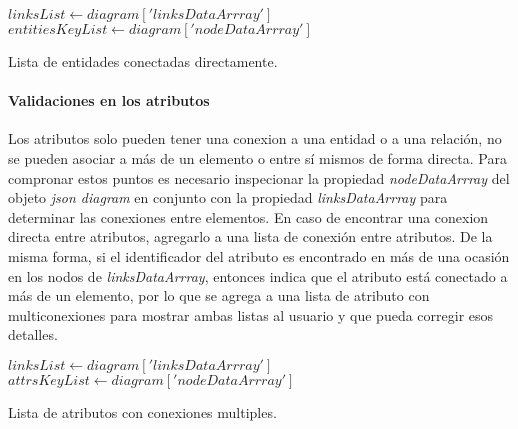 \begin{algorithm}[H]

  $linksList \gets diagram['linksDataArrray']$\\
  $entitiesKeyList \gets diagram['nodeDataArrray']$\\
  
  \caption{Lista de entidades conectadas directamente.}
\end{algorithm}

\paragraph*{Validaciones en los atributos}

Los atributos solo pueden tener una conexion a una entidad o a una relación, no se pueden asociar a más de un elemento o entre sí mismos de forma directa. Para compronar estos puntos es necesario inspecionar la propiedad \textit{nodeDataArrray} del objeto \textit{json diagram} en conjunto con la propiedad \textit{linksDataArrray} para determinar las conexiones entre elementos. En caso de encontrar una conexion directa entre atributos, agregarlo a una lista de conexión entre atributos. De la misma forma, si el identificador del atributo es encontrado en más de una ocasión en los nodos de \textit{linksDataArrray}, entonces indica que el atributo está conectado a más de un elemento, por lo que se agrega a una lista de atributo con multiconexiones para mostrar ambas listas al usuario y que pueda corregir esos detalles.

\begin{algorithm}[H]

  $linksList \gets diagram['linksDataArrray']$\\
  $attrsKeyList \gets diagram['nodeDataArrray']$\\

  \caption{Lista de atributos con conexiones multiples.}
\end{algorithm}

